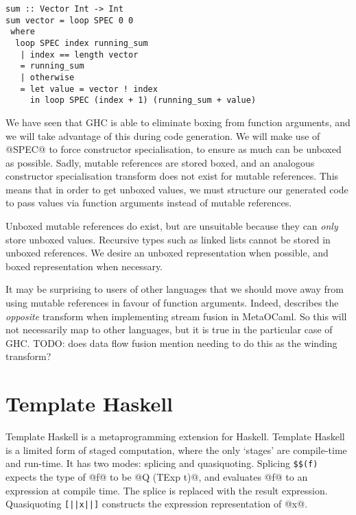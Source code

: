 \begin{lstlisting}
sum :: Vector Int -> Int
sum vector = loop SPEC 0 0
 where
  loop SPEC index running_sum
   | index == length vector
   = running_sum
   | otherwise
   = let value = vector ! index
     in loop SPEC (index + 1) (running_sum + value)
\end{lstlisting}


We have seen that GHC is able to eliminate boxing from function arguments, and we will take advantage of this during code generation.
We will make use of @SPEC@ to force constructor specialisation, to ensure as much can be unboxed as possible.
Sadly, mutable references are stored boxed, and an analogous constructor specialisation transform does not exist for mutable references.
This means that in order to get unboxed values, we must structure our generated code to pass values via function arguments instead of mutable references.

Unboxed mutable references do exist, but are unsuitable because they can \emph{only} store unboxed values.
Recursive types such as linked lists cannot be stored in unboxed references.
We desire an unboxed representation when possible, and boxed representation when necessary.

It may be surprising to users of other languages that we should move away from using mutable references in favour of function arguments.
Indeed, \citet{biboudis2017expressive} describes the \emph{opposite} transform when implementing stream fusion in MetaOCaml.
So this will not necessarily map to other languages, but it is true in the particular case of GHC.
TODO: does data flow fusion mention needing to do this as the winding transform? \cite{lippmeier2013data}



\section{Template Haskell}
Template Haskell is a metaprogramming extension for Haskell.
Template Haskell is a limited form of staged computation, where the only `stages' are compile-time and run-time.
It has two modes: splicing and quasiquoting.
Splicing \verb/$$(f)/ expects the type of @f@ to be @Q (TExp t)@, and evaluates @f@ to an expression at compile time.
The splice is replaced with the result expression.
Quasiquoting \lstinline/[||x||]/ constructs the expression representation of @x@.

